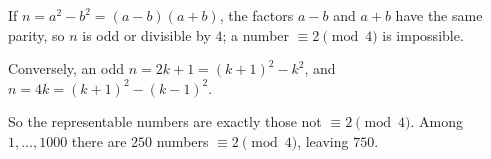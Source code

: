 If $n=a^2-b^2=(a-b)(a+b)$, the factors $a-b$ and $a+b$ have the same parity, so $n$ is odd or divisible by $4$; a number $\equiv2\pmod4$ is impossible.

Conversely, an odd $n=2k+1=(k+1)^2-k^2$, and $n=4k=(k+1)^2-(k-1)^2$.

So the representable numbers are exactly those not $\equiv2\pmod4$. Among $1,\dots,1000$ there are $250$ numbers $\equiv2\pmod4$, leaving $\boxed{750}$.
